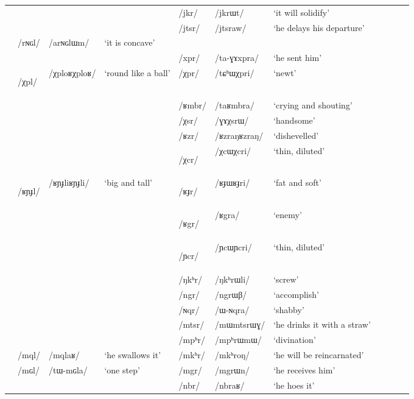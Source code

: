 \documentclass[oneside,a4paper,11pt]{article}
\newcommand{\ipa}[1]{\mbox{\phon/#1/}}
\newcommand{\trois}[1]{\ipa{#1}\addtocounter{3clusters}{1}}
\newcommand{\tib}[1]{\cellcolor{lightgray}\textbf{#1}}
\newcommand{\idph}[1]{\cellcolor{gray}\textbf{#1}}
\newcommand{\resetcounters}[2]{
\newcounter{#1}
\newcounter{#2}
 \setcounter{#1}{\value{2clusters}}
  \setcounter{#2}{\value{3clusters}}
 \setcounter{2clusters}{0}
  \setcounter{3clusters}{0}
}
\begin{document}
\begin{table}
{\begin{tabular}{lllllllllll}
\midrule       
 & & & &\trois{jkr} & \ipa{jkrɯt} & `it will solidify' \\ 
 & & & &\trois{jtsr} & \ipa{jtsraw} & `he delays his departure' \\ 
\midrule   
 & \trois{rɴɢl} & \ipa{arɴɢlɯm} & `it is concave' & & &\\ 
 & & & & \trois{xpr} & \ipa{ta-ɣɤxpra} & `he sent him' \\ 
\midrule       
 &\trois{χpl} \idph{} &\ipa{χploʁχploʁ} & `round like a ball' &\trois{χpr} & \ipa{tɕʰɯχpri} & `newt' \\ 
 & & & &\trois{ʁmbr} & \ipa{taʁmbra} & `crying and shouting' \\ 
 & & & &\trois{χsr} & \ipa{ɣɤχsrɯ} & `handsome' \\ 
 & & & &\trois{ʁzr} & \ipa{ʁzraŋʁzraŋ} & `dishevelled' \\ 
 & & & &\trois{χcr} \idph{} & \ipa{χcɯχcri} & `thin, diluted' \\ 
 &\trois{ʁɲɟl}  \idph{} & \ipa{ʁɲɟliʁɲɟli} & `big and tall' &\trois{ʁɟr}  \idph{} & \ipa{ʁɟɯʁɟri} & `fat and soft' \\ 
 & & & &\trois{ʁgr} \tib{} & \ipa{ʁgra} & `enemy' \\ 
\midrule       
 & & & &\trois{ɲcr} \idph{} & \ipa{ɲcɯɲcri} & `thin, diluted' \\ 
 & & & &\trois{ŋkʰr} & \ipa{ŋkʰrɯli} & `screw' \\ 
 & & & &\trois{ngr} & \ipa{ngrɯβ} & `accomplish' \\
 & & & &\trois{ɴqr} & \ipa{ɯ-ɴqra} & `shabby' \\ 
\midrule       
 & & & &\trois{mtsr} & \ipa{mɯmtsrɯɣ} & `he drinks it with a straw' \\ 
 & & & &\trois{mpʰr} & \ipa{mpʰrɯmɯ} & `divination' \\ 
 &\trois{mql} & \ipa{mqlaʁ} & `he swallows it' &\trois{mkʰr} & \ipa{mkʰroŋ} & `he will be reincarnated' \\ 
 &\trois{mɢl} & \ipa{tɯ-mɢla} & `one step' &\trois{mgr} & \ipa{mgrɯn} & `he receives him' \\ 
\midrule       
 & & & &\trois{nbr} & \ipa{nbraʁ} & `he hoes it' \\ 
\end{tabular}}
\end{table} 
     \resetcounters{2Clr}{3Clr} %
  
      
      
\end{document}
